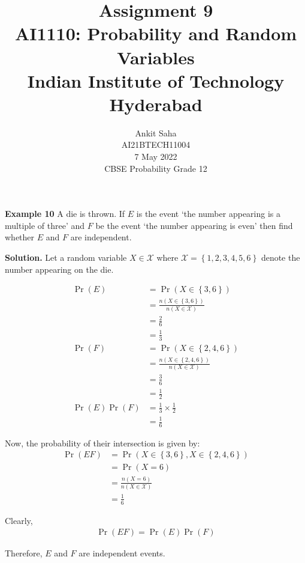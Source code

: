 \documentclass[journal,12pt,twocolumn]{IEEEtran}
\title{Assignment 9 \\ \Large AI1110: Probability and Random Variables \\ \large Indian Institute of Technology Hyderabad}
\author{Ankit Saha \\ \normalsize AI21BTECH11004 \\ \vspace*{20pt} \normalsize  7 May 2022 \\ \vspace*{20pt} \Large CBSE Probability Grade 12}
\providecommand{\pr}[1]{\ensuremath{\Pr\left(#1\right)}}
\providecommand{\cbrak}[1]{\ensuremath{\left\{#1\right\}}}
\begin{document}
	\maketitle
	
	\textbf{Example 10} 
	A die is thrown. If $E$ is the event `the number appearing is a multiple of three' and $F$ be the event `the number appearing is even' then find whether $E$ and $F$ are independent.	 
	
	\textbf{Solution.}
	Let a random variable $X \in \mathcal{X}$ where $\mathcal{X} = \cbrak{1,2,3,4,5,6}$ denote the number appearing on the die.
	\begin{table}[ht!]
		\centering
		
		\caption{}
		\label{table:table1}	
	\end{table}	
	\begin{align}
		\pr{E} &= \pr{X \in \cbrak{3,6}} \\
		&= \frac{n(X \in \cbrak{3,6})}{n(X \in \mathcal{X})} \\
		&= \frac26 \\
		&= \frac13 \\
		\pr{F} &= \pr{X \in \cbrak{2,4,6}} \\
		&= \frac{n(X \in \cbrak{2,4,6})}{n(X \in \mathcal{X})} \\
		&= \frac36 \\
		&= \frac12 \\
		\pr{E} \pr{F} &= \frac13 \times \frac12 \\
		&= \frac16		
	\end{align}
	
	Now, the probability of their intersection is given by:
	\begin{align}
		\pr{EF} &= \pr{X \in \cbrak{3,6}, X \in \cbrak{2,4,6}} \\
		&= \pr{X = 6} \\
		&= \frac{n(X = 6)}{n(X \in \mathcal{X})} \\ 
		&= \frac16
	\end{align}
	
	Clearly, 
	\begin{align}
		\pr{EF} = \pr{E} \pr{F}
	\end{align}
	
	Therefore, $E$ and $F$ are independent events.
			
\end{document}
